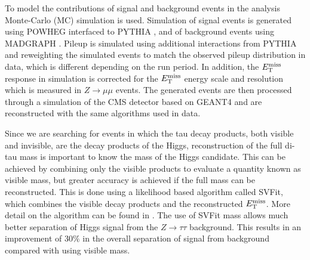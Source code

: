 To model the contributions of signal and background events in the analysis
Monte-Carlo (MC) simulation is used. Simulation of signal events is generated
using POWHEG \cite{powheg} interfaced to PYTHIA \cite{pythia}, and of
background events using MADGRAPH \cite{madgraph}. Pileup is simulated using
additional interactions from PYTHIA and reweighting the simulated events to
match the observed pileup distribution in data, which is different depending on
the run period. In addition, the $E_{\rm{T}}^{\rm{miss}}$ response in
simulation is corrected for the $E_{\rm{T}}^{\rm{miss}}$ energy scale and
resolution which is measured in $Z\rightarrow\mu\mu$ events. The generated
events are then processed through a simulation of the CMS detector based on
GEANT4 \cite{geant4} and are reconstructed with the same algorithms used in
data.

Since we are searching for events in which the tau decay products, both visible
and invisible, are the decay products of the Higgs, reconstruction of the full
di-tau mass is important to know the mass of the Higgs candidate. This can be
achieved by combining only the visible products to evaluate a quantity known as
visible mass, but greater accuracy is achieved if the full mass can be
reconstructed. This is done using a likelihood based algorithm called SVFit,
which combines the visible decay products and the reconstructed
$E_{\rm{T}}^{\rm{miss}}$. More detail on the algorithm can be found in
\cite{CMS-PAS-HIG-13-004}. The use of SVFit mass allows much better separation
of Higgs signal from the $Z\rightarrow\tau\tau$ background. This results in an
improvement of 30$\%$ in the overall separation of signal from background
compared with using visible mass.


